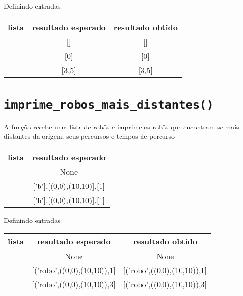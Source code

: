\begin{apendicesenv}
Definindo entradas:

\begin{center}
    \begin{tabular}{|c|c|c|}
        \cline{1-3}
        lista & resultado esperado & resultado obtido  \\ \hline
        [] & [] & [] \\ \hline
        [5] & [0] & [0] \\ \hline
        [1,2,3,10,1,10] & [3,5] & [3,5] \\ \hline

    \end{tabular}
\end{center} 


\section{\texttt{imprime\_robos\_mais\_distantes()}}
A função recebe uma lista de robôs e imprime os robôs que encontram-se mais distantes da origem, seus percursos e tempos de percurso
\begin{center}
    \begin{tabular}{|c|c|}
        \cline{1-2}
        lista & resultado esperado \\ \hline
        [] & None \\ \hline  
        [('b',(10,10),1)] & ['b'],[(0,0),(10,10)],[1] \\ \hline
        [('a',(5,4),1),('b',(10,10),1)] & ['b'],[(0,0),(10,10)],[1]  \\ \hline
    \end{tabular}
\end{center}

Definindo entradas:

\begin{center}
    \begin{tabular}{|c|c|c|}
        \cline{1-3}
        lista & resultado esperado & resultado obtido  \\ \hline
        [] & None & None \\ \hline
        [('robo',1,(10,10),3)] & [('robo',((0,0),(10,10)),1] & [('robo',((0,0),(10,10)),1] \\ \hline
        [('robo',1,(10,10),3),('robo2',1,(2,1),3)] & [('robo',((0,0),(10,10)),3] & [('robo',((0,0),(10,10)),3]  \\ \hline

    \end{tabular}
\end{center}





\end{apendicesenv}
